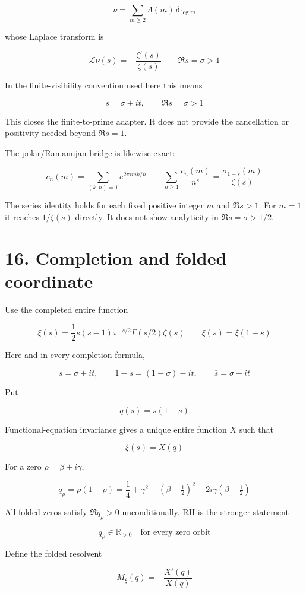 \documentclass[
  11pt,
]{book}
\begin{document}
\[
\nu=\sum_{m\ge2}\Lambda(m)\,\delta_{\log m}
\]

whose Laplace transform is

\[
\mathcal L\nu(s)=-\frac{\zeta'(s)}{\zeta(s)}
\qquad \Re s=\sigma>1
\]

In the finite-visibility convention used here this means

\[
s=\sigma+it,\qquad \Re s=\sigma>1
\]

This closes the finite-to-prime adapter. It does not provide the
cancellation or positivity needed beyond \(\Re s=1\).

The polar/Ramanujan bridge is likewise exact:

\[
c_n(m)=\sum_{(k,n)=1}e^{2\pi i mk/n}
\qquad
\sum_{n\ge1}\frac{c_n(m)}{n^{s}}
=\frac{\sigma_{1-s}(m)}{\zeta(s)}
\]

The series identity holds for each fixed positive integer \(m\) and
\(\Re s>1\). For \(m=1\) it reaches \(1/\zeta(s)\) directly. It does not
show analyticity in \(\Re s=\sigma>1/2\).

\section{16. Completion and folded
coordinate}\label{completion-and-folded-coordinate}

Use the completed entire function

\[
\xi(s)=\frac12s(s-1)
\pi^{-s/2}\Gamma(s/2)\zeta(s)
\qquad
\xi(s)=\xi(1-s)
\]

Here and in every completion formula,

\[
\boxed{
s=\sigma+it,\qquad
1-s=(1-\sigma)-it,\qquad
\bar s=\sigma-it}
\tag{16.0}
\]

Put

\[
q(s)=s(1-s)
\]

Functional-equation invariance gives a unique entire function \(X\) such
that

\[
\xi(s)=X(q)
\]

For a zero \(\rho=\beta+i\gamma\),

\[
q_\rho=\rho(1-\rho)
=\frac14+\gamma^2-(\beta-\tfrac12)^2
-2i\gamma(\beta-\tfrac12)
\]

All folded zeros satisfy \(\Re q_\rho>0\) unconditionally. RH is the
stronger statement

\[
\boxed{q_\rho\in\mathbb R_{>0}\quad\text{for every zero orbit}}
\]

Define the folded resolvent

\[
M_\xi(q)=-\frac{X'(q)}{X(q)}
\]
\end{document}
